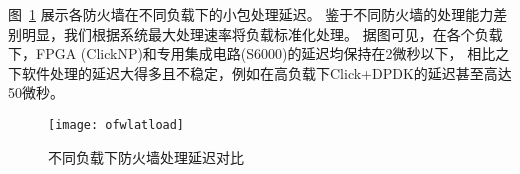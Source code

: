 图~\ref{fig:ofwlatload} 展示各防火墙在不同负载下的小包处理延迟。
鉴于不同防火墙的处理能力差别明显，我们根据系统最大处理速率将负载标准化处理。
据图可见，在各个负载下，FPGA (ClickNP)和专用集成电路(S6000)的延迟均保持在2微秒以下，
相比之下软件处理的延迟大得多且不稳定，例如在高负载下Click+DPDK的延迟甚至高达50微秒。
\begin{figure}[ht]
\centering
\texttt{[image: ofwlatload]}
\caption{不同负载下防火墙处理延迟对比} \label{fig:ofwlatload}
\end{figure}
